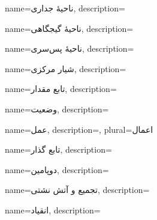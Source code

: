 {
	name={ناحیهٔ جداری},
	description=\hfill{}
}

{
	name={ناحیهٔ گیجگاهی},
	description=\hfill{}
}

{
	name={ناحیهٔ پس‌سری},
	description=\hfill{}
}

{
	name={شیار مرکزی},
	description=\hfill{}
}

{
    name={تابع مقدار},
    description=\hfill{}
}

{
    name={وضعیت},
    description=\hfill{}
}

{
    name={عمل},
    description=\hfill{},
    plural={اعمال}
}

{
    name={تابع گذار},
    description=\hfill{}
}

{
    name={دوپامین},
    description=\hfill{}
}

{
    name={تجمیع و آتش نشتی},
    description=\hfill{}
}


{
	name={انقیاد},
	description=\hfill{}
}
